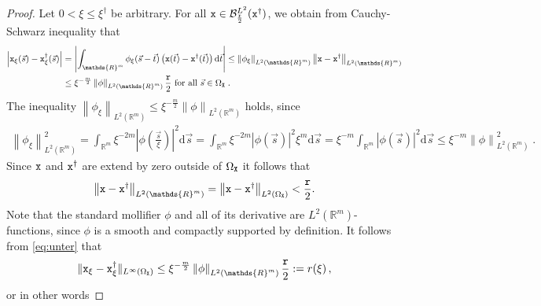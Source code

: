 \documentclass[10pt]{article}
\numberwithin{equation}{section}
\theoremstyle{nonumberplain}
\newtheorem{proof}{Proof}
\newcommand{\R}{\mathds{R}}
\newcommand{\abs}[1]{\left|#1\right|}
\newcommand{\norm}[1]{\left\|#1\right\|}
\newcommand{\norms}[1]{\|#1\|}
\newcommand{\bs}{\vec{s}}
\newcommand{\bt}{\vec{t}}
\newcommand{\X}{{\tt X}}
\newcommand{\x}{{\tt x}}
\newcommand{\xdag}{\x^\dagger}
\begin{document}
\begin{proof}
Let $0< \xi \leq \xi^\dagger$ be arbitrary. For all $\x \in \mathcal{B}_{\frac{\tt r}{2}}^{L^2}(\xdag)$, we obtain from Cauchy-Schwarz inequality that 
\begin{equation} \label{eq:unter}
\begin{aligned}
	\abs{\x_\xi(\bs) - \xdag_\xi(\bs)} &= \abs{\int_{\R^m} \phi_\xi(\bs - \bt)\left(\x(\bt)- \xdag(\bt)\right)  \mathrm{d}\bt} \leq \norm{\phi_\xi}_{L^2(\R^m)}\norm{\x - \xdag}_{L^2(\R^m)} \\ &\leq \xi^{-\frac{m}{2}} \norm{\phi}_{L^2(\R^m)} \frac{\tt r}{2} \text{ for all } \bs \in \Omega_\X\;.
\end{aligned}
\end{equation}
%
The inequality $\norm{\phi_\xi}_{L^2(\R^m)} \leq \xi^{-\frac{m}{2}} \norm{\phi}_{L^2(\R^m)}$ holds, since
\begin{align*}
\norm{\phi_\xi}_{L^2(\R^m)}^2 = \int_{\R^m} \xi^{-2m}\abs{\phi\left(\frac{\bs}{\xi}\right)}^2 \mathrm{d}\bs = \int_{\R^m}  \xi^{-2m}\abs{\phi(\bs)}^2 \xi^m \mathrm{d}\bs =  \xi^{-m}\int_{\R^m}  \abs{\phi(\bs)}^2 \mathrm{d}\bs \leq \xi^{-m}\norm{\phi}^2_{L^2(\R^m)}\;.
\end{align*}
Since $\x$ and $\xdag$ are extend by zero outside of $\Omega_\X$ it follows that
 $$\norm{\x - \xdag}_{L^2(\R^m)} = \norm{\x - \xdag}_{L^2(\Omega_\X)} < \frac{\tt r}{2}.$$
Note that the standard mollifier $\phi$ and all of its derivative are $L^2(\R^m)$-functions, since $\phi$ is a smooth and compactly supported by definition.
It follows from \autoref{eq:unter} that
\begin{align*}
	\norms{\x_\xi - \xdag_\xi}_{L^\infty(\Omega_\X)} \leq \xi^{-\frac{m}{2}} \norm{\phi}_{L^2(\R^m)} \frac{\tt r}{2} := r(\xi)\,,
\end{align*}
or in other words
 

\end{proof}
\end{document}
